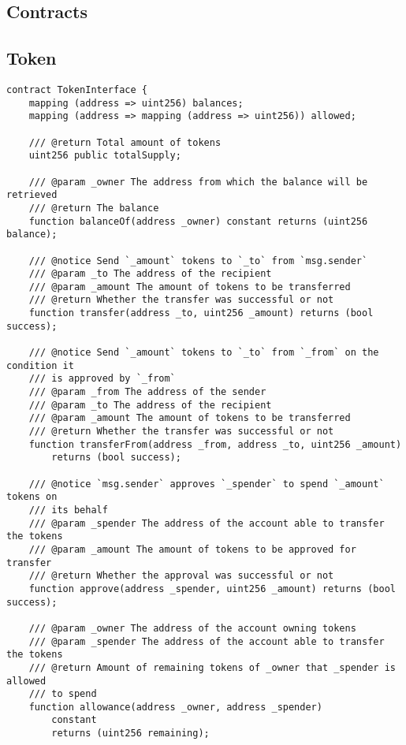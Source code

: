 \documentclass[9pt,oneside]{amsart}
\begin{document}


\begin{appendix}

\section{Contracts}
\subsection{Token}\label{app:Token}
\begin{verbatim}
contract TokenInterface {
    mapping (address => uint256) balances;
    mapping (address => mapping (address => uint256)) allowed;

    /// @return Total amount of tokens
    uint256 public totalSupply;

    /// @param _owner The address from which the balance will be retrieved
    /// @return The balance
    function balanceOf(address _owner) constant returns (uint256 balance);

    /// @notice Send `_amount` tokens to `_to` from `msg.sender`
    /// @param _to The address of the recipient
    /// @param _amount The amount of tokens to be transferred
    /// @return Whether the transfer was successful or not
    function transfer(address _to, uint256 _amount) returns (bool success);

    /// @notice Send `_amount` tokens to `_to` from `_from` on the condition it 
    /// is approved by `_from`
    /// @param _from The address of the sender
    /// @param _to The address of the recipient
    /// @param _amount The amount of tokens to be transferred
    /// @return Whether the transfer was successful or not
    function transferFrom(address _from, address _to, uint256 _amount) 
        returns (bool success);

    /// @notice `msg.sender` approves `_spender` to spend `_amount` tokens on 
    /// its behalf
    /// @param _spender The address of the account able to transfer the tokens
    /// @param _amount The amount of tokens to be approved for transfer
    /// @return Whether the approval was successful or not
    function approve(address _spender, uint256 _amount) returns (bool success);

    /// @param _owner The address of the account owning tokens
    /// @param _spender The address of the account able to transfer the tokens
    /// @return Amount of remaining tokens of _owner that _spender is allowed 
    /// to spend
    function allowance(address _owner, address _spender) 
        constant 
        returns (uint256 remaining);


\end{verbatim}
\end{appendix}
\end{document}
